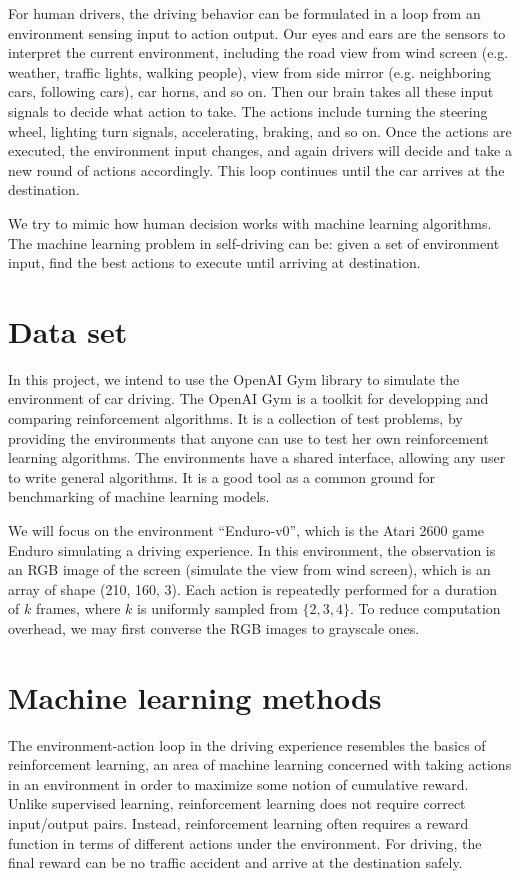 \documentclass[a4paper]{article}
\begin{document}
For human drivers, the driving behavior can be formulated in a loop from an environment sensing input to action output. Our eyes and ears are the sensors to interpret the current environment, including the road view from wind screen (e.g. weather, traffic lights, walking people), view from side mirror (e.g. neighboring cars, following cars), car horns, and so on. Then our brain takes all these input signals to decide what action to take. The actions include turning the steering wheel, lighting turn signals, accelerating, braking, and so on. Once the actions are executed, the environment input changes, and again drivers will decide and take a new round of actions accordingly. This loop continues until the car arrives at the destination. 

We try to mimic how human decision works with machine learning algorithms. The machine learning problem in self-driving can be: given a set of environment input, find the best actions to execute until arriving at destination.


\section{Data set}

In this project, we intend to use the OpenAI Gym library to simulate the environment of car driving. The OpenAI Gym \cite{gym} is a toolkit for developping and comparing reinforcement algorithms. It is a collection of test problems, by providing the environments that anyone can use to test her own reinforcement learning algorithms. The environments have a shared interface, allowing any user to write general algorithms. It is a good tool as a common ground for benchmarking of machine learning models.

We will focus on the environment ``Enduro-v0'', which is the Atari 2600 game Enduro simulating a driving experience. In this environment, the observation is an RGB image of the screen (simulate the view from wind screen), which is an array of shape (210, 160, 3). Each action is repeatedly performed for a duration of $k$ frames, where $k$ is uniformly sampled from $\{2, 3, 4\}$. To reduce computation overhead, we may first converse the RGB images to grayscale ones.

\section{Machine learning methods}

The environment-action loop in the driving experience resembles the basics of reinforcement learning, an area of machine learning concerned with taking actions in an environment in order to maximize some notion of cumulative reward. Unlike supervised learning, reinforcement learning does not require correct input/output pairs. Instead, reinforcement learning often requires a reward function in terms of different actions under the environment. For driving, the final reward can be no traffic accident and arrive at the destination safely.
\end{document}
